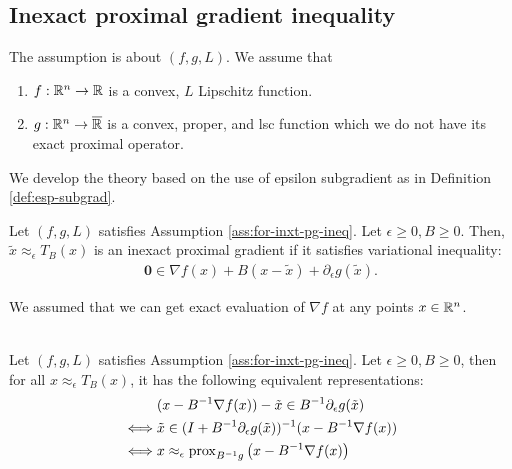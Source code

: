 \documentclass[12pt]{article}
\begin{document}
    \subsection{Inexact proximal gradient inequality}
        \begin{assumption}\label{ass:for-inxt-pg-ineq}
            The assumption is about $(f, g, L)$. 
            We assume that 
            \begin{enumerate}[nosep]
                \item $f: \mathbb R^n \rightarrow \mathbb R$ is a convex, $L$ Lipschitz function. 
                \item $g: \mathbb R^n \rightarrow \overline{\mathbb R}$ is a convex, proper, and lsc function which we do not have its exact proximal operator. 
            \end{enumerate}
        \end{assumption}
        We develop the theory based on the use of epsilon subgradient as in Definition \ref{def:esp-subgrad}. 
        \begin{definition}\label{def:inxt-pg}
            Let $(f, g, L)$ satisfies Assumption \ref{ass:for-inxt-pg-ineq}. 
            Let $\epsilon \ge 0, B \ge 0$. 
            Then, $\tilde x \approx_\epsilon T_B(x)$ is an inexact proximal gradient if it satisfies variational inequality: 
            \begin{align*}
                \mathbf 0 \in \nabla f(x) + B(x - \tilde x) + \partial_{\epsilon} g(\tilde x). 
            \end{align*}
        \end{definition}
        \begin{remark}
            We assumed that we can get exact evaluation of $\nabla f$ at any points $x \in \mathbb R^n$. 
        \end{remark}
        \begin{lemma}\;\\
            Let $(f, g, L)$ satisfies Assumption \ref{ass:for-inxt-pg-ineq}.
            Let $\epsilon \ge 0, B \ge 0$, then for all $x \approx_\epsilon T_B(x)$, it has the following equivalent representations: 
            \begin{align*}
                & (x - B^{-1}\nabla f(x)) - \tilde x 
                \in B^{-1} \partial_\epsilon g(\tilde x)
                \\
                \iff 
                & \tilde x \in (I + B^{-1}\partial_\epsilon g(\tilde x))^{-1}
                (x - B^{-1}\nabla f(x))
                \\
                \iff 
                & x \approx_\epsilon \operatorname{prox}_{B^{-1} g}
                \left(x - B^{-1}\nabla f(x)\right)
            \end{align*}
        \end{lemma}
\end{document}
